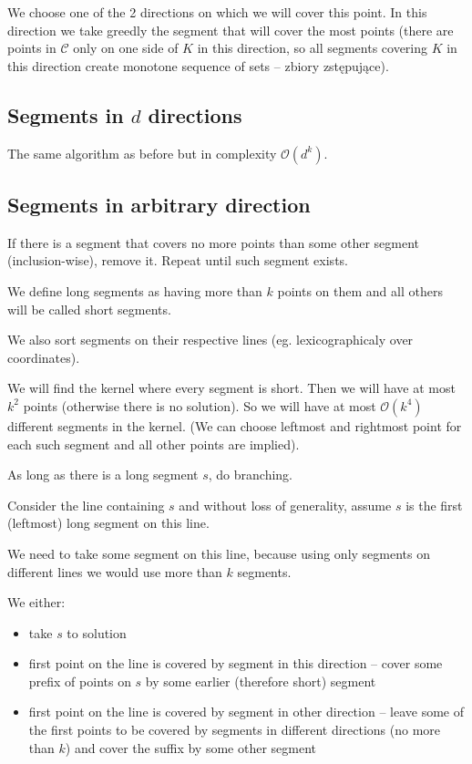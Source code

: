 \documentclass[en]{pracamgr}
\newcommand{\points}{\mathcal{C}}
\begin{document}
We choose one of the 2 directions on which we will cover this point.
In this direction we take greedly the segment that will cover
the most points (there are points in $\points$ only on
one side of $K$ in this direction, so all
segments covering $K$ in this direction create monotone sequence
of sets -- zbiory zstępujące).

\subsection{Segments in $d$ directions}
The same algorithm as before but in complexity $\mathcal{O}(d^k)$.

\subsection{Segments in arbitrary direction}
If there is a segment that covers no more 
points than some other segment (inclusion-wise), remove it.
Repeat until such segment exists.

We define long segments as having more than $k$ points on them
and all others will be called short segments.

We also sort segments on their respective lines
(eg. lexicographicaly over coordinates).

We will find the kernel where every segment is short.
Then we will have at most $k^2$ points (otherwise there is no solution).
So we will have at most $\mathcal{O}(k^4)$ different segments
in the kernel. (We can choose leftmost and rightmost
point for each such segment and all other points are implied).

As long as there is a long segment $s$, do branching.

Consider the line containing $s$ and 
without loss of generality, assume $s$ is the first (leftmost)
long segment on this line.

We need to take some segment on this line,
because using only segments on different lines we would use
more than $k$ segments.

We either:
\begin{itemize}
\item take $s$ to solution
\item first point on the line is covered by segment in this direction -- cover some prefix of points on $s$ by some earlier (therefore short) segment
\item first point on the line is covered by segment in other direction -- leave some of the first points to be covered by segments in different directions (no more than $k$) and cover the suffix by some other segment
\end{itemize}
\end{document}
